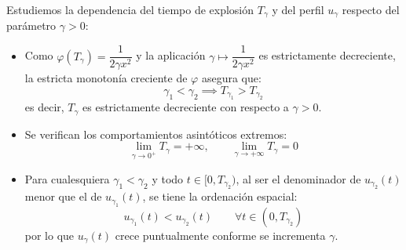 {    Estudiemos la dependencia del tiempo de explosión $T_\gamma$ y del perfil $u_\gamma$ respecto del parámetro $\gamma > 0$:
    \begin{itemize}
        \item Como $\varphi(T_\gamma) = \dfrac{1}{2\gamma x^2}$ y la aplicación $\gamma \mapsto \dfrac{1}{2\gamma x^2}$ es estrictamente decreciente, la estricta monotonía creciente de $\varphi$ asegura que:
        \[
            \gamma_1 < \gamma_2 \implies T_{\gamma_1} > T_{\gamma_2}
        \]
        es decir, $T_\gamma$ es estrictamente decreciente con respecto a $\gamma > 0$.
        \item Se verifican los comportamientos asintóticos extremos:
        \[
            \lim_{\gamma \to 0^+} T_\gamma = +\infty, \qquad \lim_{\gamma \to +\infty} T_\gamma = 0
        \]
        \item Para cualesquiera $\gamma_1 < \gamma_2$ y todo $t \in [0, T_{\gamma_2})$, al ser el denominador de $u_{\gamma_2}(t)$ menor que el de $u_{\gamma_1}(t)$, se tiene la ordenación espacial:
        \[
            u_{\gamma_1}(t) < u_{\gamma_2}(t) \qquad \forall t \in (0, T_{\gamma_2})
        \]
        por lo que $u_\gamma(t)$ crece puntualmente conforme se incrementa $\gamma$.
    \end{itemize}

    \begin{center}
\end{center}}

